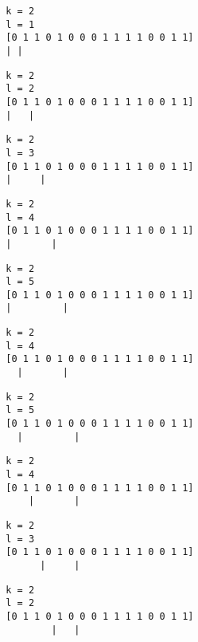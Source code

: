 { \begin{verbatim}
        k = 2
        l = 1
        [0 1 1 0 1 0 0 0 1 1 1 1 0 0 1 1]
        | |
\end{verbatim} }

{ \begin{verbatim}
        k = 2
        l = 2
        [0 1 1 0 1 0 0 0 1 1 1 1 0 0 1 1]
        |   |
\end{verbatim} }

{ \begin{verbatim}
        k = 2
        l = 3
        [0 1 1 0 1 0 0 0 1 1 1 1 0 0 1 1]
        |     |
\end{verbatim} }

{ \begin{verbatim}
        k = 2
        l = 4
        [0 1 1 0 1 0 0 0 1 1 1 1 0 0 1 1]
        |       |
\end{verbatim} }

{ \begin{verbatim}
        k = 2
        l = 5
        [0 1 1 0 1 0 0 0 1 1 1 1 0 0 1 1]
        |         |
\end{verbatim} }

{ \begin{verbatim}
        k = 2
        l = 4
        [0 1 1 0 1 0 0 0 1 1 1 1 0 0 1 1]
          |       |
\end{verbatim} }

{ \begin{verbatim}
        k = 2
        l = 5
        [0 1 1 0 1 0 0 0 1 1 1 1 0 0 1 1]
          |         |
\end{verbatim} }

{ \begin{verbatim}
        k = 2
        l = 4
        [0 1 1 0 1 0 0 0 1 1 1 1 0 0 1 1]
            |       |
\end{verbatim} }

{ \begin{verbatim}
        k = 2
        l = 3
        [0 1 1 0 1 0 0 0 1 1 1 1 0 0 1 1]
              |     |
\end{verbatim} }

{ \begin{verbatim}
        k = 2
        l = 2
        [0 1 1 0 1 0 0 0 1 1 1 1 0 0 1 1]
                |   |
\end{verbatim} }

